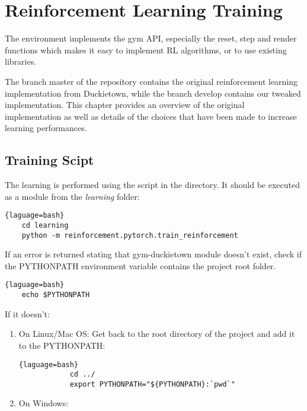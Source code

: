 \chapter{Reinforcement Learning Training}

The environment implements the gym API, especially the reset, step and render functions which makes it easy to implement RL algorithms, or to use existing libraries.

The branch master of the repository\cite{forked_gym_duckietown} contains the original reinforcement learning implementation from Duckietown, while the branch develop contains our tweaked implementation.
This chapter provides an overview of the original implementation as well as details of the choices that have been made to increase learning performances.

\section{Training Scipt}

The learning is performed using the  script in the  directory.
It should be executed as a module from the \textit{learning} folder:

\begin{lstlisting}{laguage=bash}
    cd learning
    python -m reinforcement.pytorch.train_reinforcement
\end{lstlisting}

If an error is returned stating that gym-duckietown module doesn't exist, check if the PYTHONPATH environment variable contains the project root folder.

\begin{lstlisting}{laguage=bash}
    echo $PYTHONPATH
\end{lstlisting}

If it doesn't:
\begin{enumerate}
    \item On Linux/Mac OS:
        Get back to the root directory of the project and add it to the PYTHONPATH:
        \begin{lstlisting}{laguage=bash}
            cd ../
            export PYTHONPATH="${PYTHONPATH}:`pwd`"
        \end{lstlisting}
    \item On Windows:

\end{enumerate}

